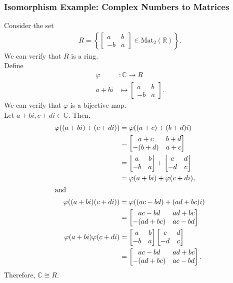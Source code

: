 \documentclass[8pt]{extarticle}
\newcommand{\R}{\mathbb{R}}
\newcommand{\C}{\mathbb{C}}
\begin{document}
  \subsubsection{Isomorphism Example: Complex Numbers to Matrices}%
  Consider the set
  \begin{align*}
    R = \left\{ \begin{bmatrix}a&b\\-b & a\end{bmatrix}\in \text{Mat}_{2}(\R)\right\}.
  \end{align*}
  We can verify that $R$ is a ring.\\

  Define
  \begin{align*}
    \varphi&: \C\rightarrow R\\
    a + bi &\mapsto \begin{bmatrix}a&b\\-b&a\end{bmatrix}.
  \end{align*}
  We can verify that $\varphi$ is a bijective map.\\

  Let $a+bi,c+di\in \C$. Then,
  \begin{align*}
    \varphi((a+bi) + (c+di)) &= \varphi((a+c) + (b+d)i)\\
                             &= \begin{bmatrix}a+c & b+ d\\-(b+d) & a+c\end{bmatrix}\\
                             &= \begin{bmatrix}a&b\\-b&a\end{bmatrix} + \begin{bmatrix}c & d\\-d&c\end{bmatrix}\\
                             &= \varphi(a+bi) + \varphi(c+di),\\
                             \shortintertext{and}
    \varphi((a+bi)(c+di)) &= \varphi((ac-bd) + (ad + bc)i)\\
                          &= \begin{bmatrix}ac-bd & ad + bc\\ -(ad + bc) & ac - bd\end{bmatrix}\\
    \varphi(a+bi)\varphi(c+di) &= \begin{bmatrix}a&b\\-b&a\end{bmatrix} \begin{bmatrix}c&d\\-d&c\end{bmatrix}\\
                               &= \begin{bmatrix}ac-bd & ad + bc\\-(ad+bc) & ac-bd\end{bmatrix}.
  \end{align*}
  Therefore, $\C\cong R$.
\end{document}
